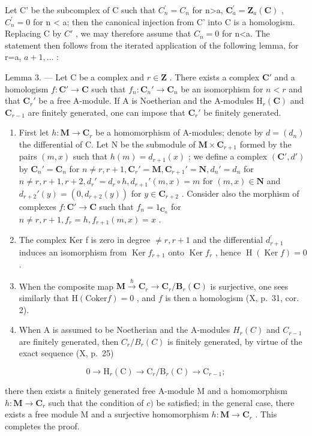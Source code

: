 Let C' be the subcomplex of C such that \(C_{n}^{\prime}=C_{n}\) for n\textgreater a, \(\mathbf{C}_{a}^{\prime}=\mathbf{Z}_{a}(\mathbf{C})\) , \(C_{n}^{\prime}=0\) for n \textless{} a; then the canonical injection from C' into C is a homologism. Replacing C by \(C'\) , we may therefore assume that \(C_{n}=0\) for n\textless a. The statement then follows from the iterated application of the following lemma, for r=a, \(a+1,\ldots\) :

Lemma 3. --- Let C be a complex and \(r \in \mathbf{Z}\) . There exists a complex \(\mathbf{C}'\) and a homologism \(f: \mathbf{C}' \to \mathbf{C}\) such that \(f_n: \mathbf{C}_n' \to \mathbf{C}_n\) be an isomorphism for \(n < r\) and that \(\mathbf{C}_r'\) be a free A-module. If A is Noetherian and the A-modules \(\mathrm{H}_r(\mathbf{C})\) and \(\mathbf{C}_{r-1}\) are finitely generated, one can impose that \(\mathbf{C}_r'\) be finitely generated.

\begin{enumerate}
\def\labelenumi{\alph{enumi})}
\item
  First let \(h: \mathbf{M} \to \mathbf{C}_r\) be a homomorphism of A-modules; denote by \(d = (d_n)\) the differential of C. Let N be the submodule of \(\mathbf{M} \times \mathbf{C}_{r+1}\) formed by the pairs \((m, x)\) such that \(h(m) = d_{r+1}(x)\) ; we define a complex \((\mathbf{C}', d')\) by \(\mathbf{C}_n' = \mathbf{C}_n\) for \(n \neq r, r+1, \mathbf{C}_r' = \mathbf{M}, \mathbf{C}_{r+1}' = \mathbf{N}, d_n' = d_n\) for \(n \neq r, r+1, r+2, d_r' = d_r \circ h, d_{r+1}'(m, x) = m\) for \((m, x) \in \mathbf{N}\) and \(d_{r+2}'(y) = (0, d_{r+2}(y))\) for \(y \in \mathbf{C}_{r+2}\) . Consider also the morphism of complexes \(f: \mathbf{C}' \to \mathbf{C}\) such that \(f_n = 1_{\mathbf{C}_n}\) for \(n \neq r, r+1, f_r = h, f_{r+1}(m, x) = x\) .
\item
  The complex Ker f is zero in degree \(\neq r, r + 1\) and the differential \(d_{r+1}^{\prime}\) induces an isomorphism from \(\operatorname{Ker} f_{r+1}\) onto \(\operatorname{Ker} f_r\) , hence \(\operatorname{H}(\operatorname{Ker} f) = 0\) .
\item
  When the composite map \(\mathbf{M} \xrightarrow{\hbar} \mathbf{C}_r \to \mathbf{C}_r / \mathbf{B}_r(\mathbf{C})\) is surjective, one sees similarly that \(\mathrm{H}(\mathrm{Coker}f) = 0\) , and \(f\) is then a homologism (X, p.~31, cor. 2).
\item
  When A is assumed to be Noetherian and the A-modules \(H_{r}(C)\) and \(C_{r-1}\) are finitely generated, then \(C_{r}/B_{r}(C)\) is finitely generated, by virtue of the exact sequence (X, p.~25)
\end{enumerate}

\[
0 \to \mathrm{H} _ {r} (\mathrm{C}) \to \mathrm{C} _ {r} / \mathrm{B} _ {r} (\mathrm{C}) \to \mathrm{C} _ {r - 1};
\]

there then exists a finitely generated free A-module M and a homomorphism \(h: \mathbf{M} \to \mathbf{C}_{r}\) such that the condition of \(c)\) be satisfied; in the general case, there exists a free module M and a surjective homomorphism \(h: \mathbf{M} \to \mathbf{C}_{r}\) . This completes the proof.

